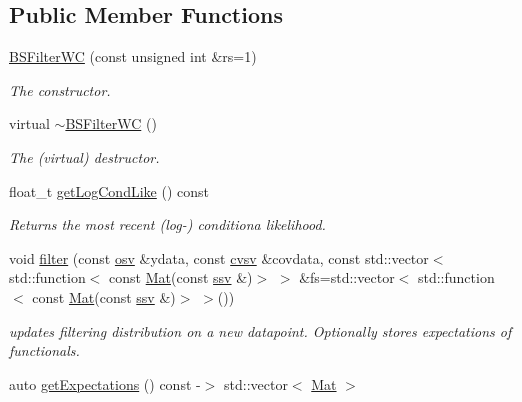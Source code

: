 \subsection*{Public Member Functions}
\begin{DoxyCompactItemize}
\item 
\hyperlink{classBSFilterWC_a8b9399d0b7008aa6bca19a87834dfd6a}{B\+S\+Filter\+WC} (const unsigned int \&rs=1)
\begin{DoxyCompactList}\small\item\em The constructor. \end{DoxyCompactList}\item 
\mbox{\label{classBSFilterWC_a125b13d2ba71b3bce05c315dea38b476}} 
virtual \hyperlink{classBSFilterWC_a125b13d2ba71b3bce05c315dea38b476}{$\sim$\+B\+S\+Filter\+WC} ()
\begin{DoxyCompactList}\small\item\em The (virtual) destructor. \end{DoxyCompactList}\item 
float\+\_\+t \hyperlink{classBSFilterWC_a26e23f7f1e17e3fb3e6a3bfdb633cc2b}{get\+Log\+Cond\+Like} () const
\begin{DoxyCompactList}\small\item\em Returns the most recent (log-\/) conditiona likelihood. \end{DoxyCompactList}\item 
void \hyperlink{classBSFilterWC_a0637035a4553ae3ffeaf1ddce0de2c6b}{filter} (const \hyperlink{classBSFilterWC_a48b0c7f1a1cf7e57300cf820e74057ce}{osv} \&ydata, const \hyperlink{classBSFilterWC_a52f5a46901a821fffe82937543220a1a}{cvsv} \&covdata, const std\+::vector$<$ std\+::function$<$ const \hyperlink{classBSFilterWC_a507a06203a27e3a025a43be68b4b0e0e}{Mat}(const \hyperlink{classBSFilterWC_afff292a8cc15505cc3aa244135203c78}{ssv} \&)$>$ $>$ \&fs=std\+::vector$<$ std\+::function$<$ const \hyperlink{classBSFilterWC_a507a06203a27e3a025a43be68b4b0e0e}{Mat}(const \hyperlink{classBSFilterWC_afff292a8cc15505cc3aa244135203c78}{ssv} \&)$>$ $>$())
\begin{DoxyCompactList}\small\item\em updates filtering distribution on a new datapoint. Optionally stores expectations of functionals. \end{DoxyCompactList}\item 
auto \hyperlink{classBSFilterWC_abbac1ed7a57f04ec34d389e3ac822a90}{get\+Expectations} () const -\/$>$ std\+::vector$<$ \hyperlink{classBSFilterWC_a507a06203a27e3a025a43be68b4b0e0e}{Mat} $>$

\end{DoxyCompactItemize}

